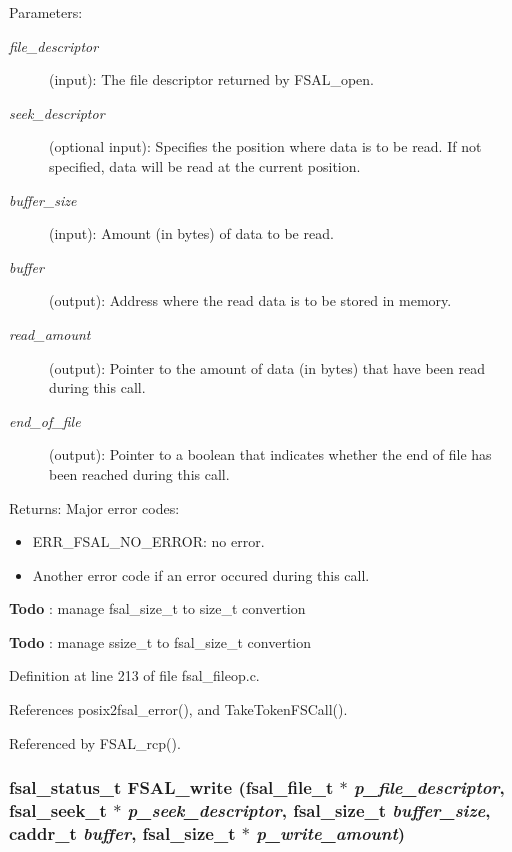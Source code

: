 \begin{Desc}
\item[Parameters:]
\begin{description}
\item[{\em file\_\-descriptor}](input): The file descriptor returned by FSAL\_\-open. \item[{\em seek\_\-descriptor}](optional input): Specifies the position where data is to be read. If not specified, data will be read at the current position. \item[{\em buffer\_\-size}](input): Amount (in bytes) of data to be read. \item[{\em buffer}](output): Address where the read data is to be stored in memory. \item[{\em read\_\-amount}](output): Pointer to the amount of data (in bytes) that have been read during this call. \item[{\em end\_\-of\_\-file}](output): Pointer to a boolean that indicates whether the end of file has been reached during this call.\end{description}
\end{Desc}
\begin{Desc}
\item[Returns:]Major error codes:\begin{itemize}
\item ERR\_\-FSAL\_\-NO\_\-ERROR: no error.\item Another error code if an error occured during this call. \end{itemize}
\end{Desc}


\begin{Desc}
\item[{\bf Todo}]: manage fsal\_\-size\_\-t to size\_\-t convertion \end{Desc}


\begin{Desc}
\item[{\bf Todo}]: manage ssize\_\-t to fsal\_\-size\_\-t convertion \end{Desc}


Definition at line 213 of file fsal\_\-fileop.c.

References posix2fsal\_\-error(), and TakeTokenFSCall().

Referenced by FSAL\_\-rcp().
\subsubsection[{FSAL\_\-write}]{\setlength{\rightskip}{0pt plus 5cm}fsal\_\-status\_\-t FSAL\_\-write (fsal\_\-file\_\-t $\ast$ {\em p\_\-file\_\-descriptor}, \/  fsal\_\-seek\_\-t $\ast$ {\em p\_\-seek\_\-descriptor}, \/  fsal\_\-size\_\-t {\em buffer\_\-size}, \/  caddr\_\-t {\em buffer}, \/  fsal\_\-size\_\-t $\ast$ {\em p\_\-write\_\-amount})}\label{fsal__fileop_8c_53bc0114a6b82957afab1a61835a3e7c}


